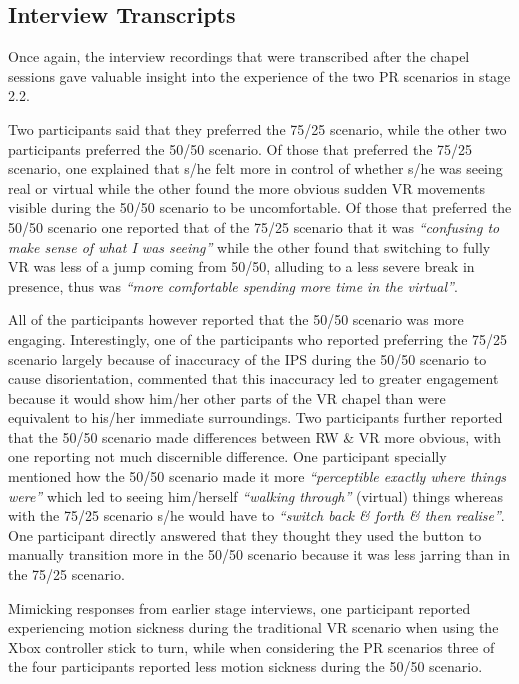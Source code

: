 
\subsection{Interview Transcripts}

Once again, the interview recordings that were transcribed after the chapel sessions gave valuable insight into the experience of the two PR scenarios in stage 2.2.

Two participants said that they preferred the 75/25 scenario, while the other two participants preferred the 50/50 scenario. Of those that preferred the 75/25 scenario, one explained that s/he felt more in control of whether s/he was seeing real or virtual while the other found the more obvious sudden VR movements visible during the 50/50 scenario to be uncomfortable. Of those that preferred the 50/50 scenario one reported that of the 75/25 scenario that it was \textit{``confusing to make sense of what I was seeing''} while the other found that switching to fully VR was less of a jump coming from 50/50, alluding to a less severe break in presence, thus was \textit{``more comfortable spending more time in the virtual''}.

All of the participants however reported that the 50/50 scenario was more engaging. Interestingly, one of the participants who reported preferring the 75/25 scenario largely because of inaccuracy of the IPS during the 50/50 scenario to cause disorientation, commented that this inaccuracy led to greater engagement because it would show him/her other parts of the VR chapel than were equivalent to his/her immediate surroundings. Two participants further reported that the 50/50 scenario made differences between RW \& VR more obvious, with one reporting not much discernible difference. One participant specially mentioned how the 50/50 scenario made it more \textit{``perceptible exactly where things were''} which led to seeing him/herself \textit{``walking through''} (virtual) things whereas with the 75/25 scenario s/he would have to \textit{``switch back \& forth \& then realise''}. One participant directly answered that they thought they used the button to manually transition more in the 50/50 scenario because it was less jarring than in the 75/25 scenario.

Mimicking responses from earlier stage interviews, one participant reported experiencing motion sickness during the traditional VR scenario when using the Xbox controller stick to turn, while when considering the PR scenarios three of the four participants reported less motion sickness during the 50/50 scenario.

